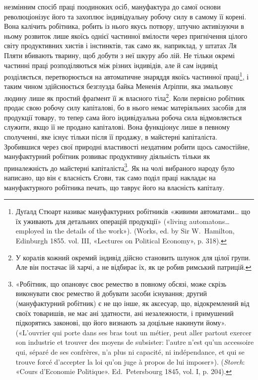 \parcont{}  %
незмінним спосіб праці поодиноких осіб, мануфактура до самої
основи революціонізує його та захоплює індивідуальну робочу
силу в самому її корені. Вона калічить робітника, робить із нього
якусь потвору, штучно активізуючи в ньому розвиток лише
якоїсь однієї частинної вмілости через пригнічення цілого світу
продуктивних хистів і інстинктів, так само як, наприклад, у
штатах Ля Пляти вбивають тварину, щоб добути з неї шкуру
або лій. Не тільки окремі частинні праці розподіляються між
різних індивідів, але й сам індивід розділяється, перетворюється
на автоматичне знаряддя якоїсь частинної праці\footnote{
Дуґалд Стюарт називає мануфактурних робітників «живими
автоматами\dots{} що їх уживають для детальних операцій продукції» («living
automatons\dots{} employed in the details of the work»). (Works, ed. by Sir
W.~Hamilton, Edinburgh 1855. vol. III, «Lectures on Political Economy»,
p. 318).
}, і таким чином
здійснюється безглузда байка Мененія Аґріппи, яка змальовує
людину лише як простий фраґмент її ж власного тіла\footnote{
У коралів кожний окремий індивід дійсно становить шлунок
для цілої групи. Але він постачає їй харчі, а не відбирає їх, як це робив
римський патрицій.
}. Коли первісно робітник продає свою робочу силу капіталові, бо в нього
немає матеріяльних засобів для продукції товару, то тепер сама
його індивідуальна робоча сила відмовляється служити, якщо
її не продано капіталові. Вона функціонує лише в певному сполученні,
яке існує тільки після її продажу, в майстерні капіталіста.
Зробившися через свої природні властивості нездатним робити
щось самостійне, мануфактурний робітник розвиває продуктивну
діяльність тільки як приналежність до майстерні капіталіста\footnote{
«Робітник, що опановує своє ремество в повному обсязі, може
скрізь виконувати своє ремество й добувати засоби існування; другий
(мануфактурний робітник) є не що інше, як аксесуар, що, відокремлений
від своїх товаришів, не має ані здатности, ані незалежности,
і примушений підкорятись законові, що його визнають за доцільне
накинути йому». («L’ouvrier qui porte dans ses bras tout un métier, peut
aller partout exercer son industrie et trouver des moyens de subsister: l’autre
n’est qu’un accessoire qui, séparé de ses confrères, n'a plus ni capacité,
ni indépendance, et qui se trouve forcé d’accepter la loi qu’on juge à
propos de lui imposer»). (\emph{Storch}: «Cours d’Economie Politique». Ed.~Petersbourg 1845, vol. I, p. 204).
}. Як на чолі вибраного народу було написано, що він є власність
Єгови, так само поділ праці накладає на мануфактурного робітника
печать, що таврує його на власність капіталу.

